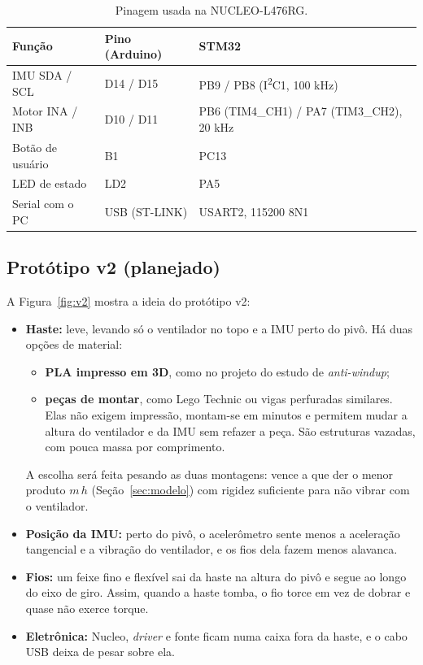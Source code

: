 \documentclass[a4paper,11pt]{article}
\begin{document}
\begin{table}[H]
\centering\small
\caption{Pinagem usada na NUCLEO-L476RG.}
\label{tab:pinos}
\begin{tabular}{@{}lll@{}}
\toprule
\textbf{Função} & \textbf{Pino (Arduino)} & \textbf{STM32} \\
\midrule
IMU SDA / SCL & D14 / D15 & PB9 / PB8 (I\textsuperscript{2}C1, 100 kHz) \\
Motor INA / INB & D10 / D11 & PB6 (TIM4\_CH1) / PA7 (TIM3\_CH2), 20 kHz \\
Botão de usuário & B1 & PC13 \\
LED de estado & LD2 & PA5 \\
Serial com o PC & USB (ST-LINK) & USART2, 115200 8N1 \\
\bottomrule
\end{tabular}
\end{table}

\subsection{Protótipo v2 (planejado)}

A Figura~\ref{fig:v2} mostra a ideia do protótipo v2:
\begin{itemize}
  \item \textbf{Haste:} leve, levando só o ventilador no topo e a IMU perto do pivô. Há duas opções
    de material:
    \begin{itemize}
      \item \textbf{PLA impresso em 3D}, como no projeto do estudo de \textit{anti-windup};
      \item \textbf{peças de montar}, como Lego Technic ou vigas perfuradas similares. Elas não exigem
        impressão, montam-se em minutos e permitem mudar a altura do ventilador e da IMU sem refazer a
        peça. São estruturas vazadas, com pouca massa por comprimento.
    \end{itemize}
    A escolha será feita pesando as duas montagens: vence a que der o menor produto $m\,h$
    (Seção~\ref{sec:modelo}) com rigidez suficiente para não vibrar com o ventilador.
  \item \textbf{Posição da IMU:} perto do pivô, o acelerômetro sente menos a aceleração tangencial e a
    vibração do ventilador, e os fios dela fazem menos alavanca.
  \item \textbf{Fios:} um feixe fino e flexível sai da haste na altura do pivô e segue ao longo do eixo
    de giro. Assim, quando a haste tomba, o fio torce em vez de dobrar e quase não exerce torque.
  \item \textbf{Eletrônica:} Nucleo, \textit{driver} e fonte ficam numa caixa fora da haste, e o cabo
    USB deixa de pesar sobre ela.
\end{itemize}
\end{document}
